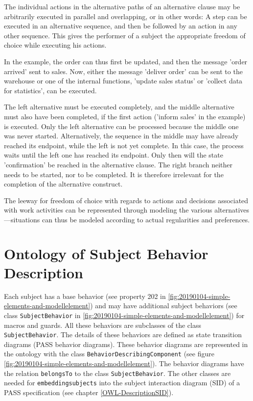 The individual actions in the alternative paths of an alternative clause may be arbitrarily executed in parallel and overlapping, or in other words: A step can be executed in an alternative sequence, and then be followed by an action in any other sequence. This gives the performer of a subject the appropriate freedom of choice while executing his actions.

In the example, the order can thus first be updated, and then the message 'order arrived' sent to sales. Now, either the message 'deliver order' can be sent to the warehouse or one of the internal functions, 'update sales status' or 'collect data for statistics', can be executed.

The left alternative must be executed completely, and the middle alternative must also have been completed, if the first action ('inform sales' in the example) is executed. Only the left alternative can be processed because the middle one was never started. Alternatively, the sequence in the middle may have already reached its endpoint, while the left is not yet complete. In this case, the process waits until the left one has reached its endpoint. Only then will the state 'confirmation' be reached in the alternative clause. The right branch neither needs to be started, nor to be completed. It is therefore irrelevant for the completion of the alternative construct.

The leeway for freedom of choice with regards to actions and decisions associated with work activities can be represented through modeling the various alternatives—situations can thus be modeled according to actual regularities and preferences.

\section{Ontology of Subject Behavior Description}

Each subject has a base behavior (see property 202 in \ref{fig:20190104-simple-elements-and-modellelement}) and may have additional subject behaviors (see class \texttt{SubjectBehavior} in \ref{fig:20190104-simple-elements-and-modellelement}) for macros and guards. All these behaviors are subclasses of the class \texttt{SubjectBehavior}. The details of these behaviors are defined as state transition diagrams (PASS behavior diagrams). These behavior diagrams are represented in the ontology with the class \texttt{BehaviorDescribingComponent} (see figure \ref{fig:20190104-simple-elements-and-modellelement}). The behavior diagrams have the relation \texttt{belongsTo} to the class \texttt{SubjectBehavior}. The other classes are needed for \texttt{embeddingsubjects} into the subject interaction diagram (SID) of a PASS specification (see chapter \ref{OWL-DescriptionSID}).

